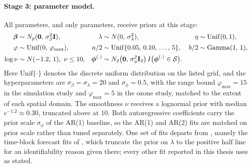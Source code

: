 \documentclass[12pt]{article}
\begin{document}
\paragraph{Stage 3: parameter model.}
All parameters, and only parameters, receive priors at this stage:
\begin{align}
  \mbox{\boldmath $\beta$} &\sim N_p(\mbox{\boldmath $0$},\, \sigma^2_\beta \mbox{\bf I}),
  &
  \lambda &\sim N(0,\, \sigma^2_\lambda),
  &
  \eta &\sim \mathrm{Unif}(0, 1),
  \nonumber\\
  \varphi &\sim \mathrm{Unif}(0,\, \varphi_{\max}),
  &
  a/2 &\sim \mathrm{Unif}\{0.05,\, 0.10,\, \ldots,\, 5\},
  &
  b/2 &\sim \mathrm{Gamma}(1,\, 1),
  \nonumber\\
  \log \nu &\sim N(-1.2,\, 1),\ \nu \le 10,
  &
  \mbox{\boldmath $\phi$}^{(\cdot)}
    &\sim N_2\big(\mbox{\boldmath $0$},\, \sigma^2_\phi \mbox{\bf I}_2\big)\,
      I\big(\mbox{\boldmath $\phi$}^{(\cdot)} \in {\cal S}\big).
  \label{eq:stage3-priors}
\end{align}
Here $\mathrm{Unif}\{\cdot\}$ denotes the discrete uniform distribution on the
listed grid, and the hyperparameters are $\sigma_\beta = \sigma_\lambda = 20$
and $\sigma_\phi = 0.5$,
with the range bound $\varphi_{\max} = 15$ in the simulation study and
$\varphi_{\max} = 5$ in the ozone study, matched to the extent of each spatial
domain.  The smoothness $\nu$ receives a lognormal prior with median
$e^{-1.2} \approx 0.30$, truncated above at $10$.  Both autoregressive
coefficients carry the
prior scale $\sigma_\phi$ of the AR(1) baseline, so the AR(1) and AR(2) fits
are matched on prior scale rather than tuned separately.  One set of fits
departs from , namely the time-block forecast fits of
, which truncate the prior on $\lambda$ to the
positive half line for an identifiability reason given there; every other fit
reported in this thesis uses  as stated.
\end{document}
